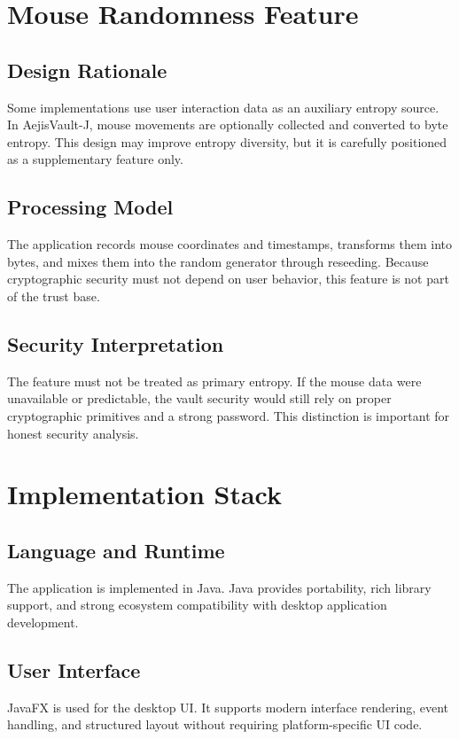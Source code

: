 \documentclass[12pt,a4paper]{report}
\newcommand{\projname}{AejisVault-J}
\begin{document}
\chapter{Mouse Randomness Feature}
\section{Design Rationale}
Some implementations use user interaction data as an auxiliary entropy source. In \projname{}, mouse movements are optionally collected and converted to byte entropy. This design may improve entropy diversity, but it is carefully positioned as a supplementary feature only.

\section{Processing Model}
The application records mouse coordinates and timestamps, transforms them into bytes, and mixes them into the random generator through reseeding. Because cryptographic security must not depend on user behavior, this feature is not part of the trust base.

\section{Security Interpretation}
The feature must not be treated as primary entropy. If the mouse data were unavailable or predictable, the vault security would still rely on proper cryptographic primitives and a strong password. This distinction is important for honest security analysis.

\chapter{Implementation Stack}
\section{Language and Runtime}
The application is implemented in Java. Java provides portability, rich library support, and strong ecosystem compatibility with desktop application development.

\section{User Interface}
JavaFX is used for the desktop UI. It supports modern interface rendering, event handling, and structured layout without requiring platform-specific UI code.
\end{document}
